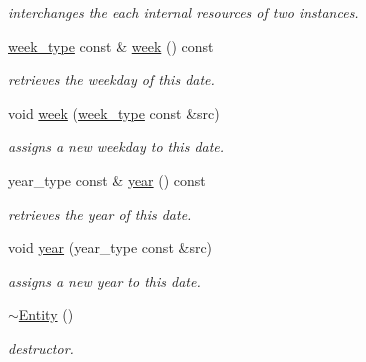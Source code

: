 \begin{DoxyCompactItemize}
\begin{DoxyCompactList}\small\item\em interchanges the each internal resources of two instances. \end{DoxyCompactList}\item 
\hypertarget{classhryky_1_1date_1_1_entity_ae2da29df451b2e3d9b145010c155bdae}{\hyperlink{classhryky_1_1_kind}{week\-\_\-type} const \& \hyperlink{classhryky_1_1date_1_1_entity_ae2da29df451b2e3d9b145010c155bdae}{week} () const }\label{classhryky_1_1date_1_1_entity_ae2da29df451b2e3d9b145010c155bdae}

\begin{DoxyCompactList}\small\item\em retrieves the weekday of this date. \end{DoxyCompactList}\item 
\hypertarget{classhryky_1_1date_1_1_entity_aa22fc221a6488db677244c4056ee1f36}{void \hyperlink{classhryky_1_1date_1_1_entity_aa22fc221a6488db677244c4056ee1f36}{week} (\hyperlink{classhryky_1_1_kind}{week\-\_\-type} const \&src)}\label{classhryky_1_1date_1_1_entity_aa22fc221a6488db677244c4056ee1f36}

\begin{DoxyCompactList}\small\item\em assigns a new weekday to this date. \end{DoxyCompactList}\item 
\hypertarget{classhryky_1_1date_1_1_entity_a75d3313038a9ddf708e60a87f107b232}{year\-\_\-type const \& \hyperlink{classhryky_1_1date_1_1_entity_a75d3313038a9ddf708e60a87f107b232}{year} () const }\label{classhryky_1_1date_1_1_entity_a75d3313038a9ddf708e60a87f107b232}

\begin{DoxyCompactList}\small\item\em retrieves the year of this date. \end{DoxyCompactList}\item 
\hypertarget{classhryky_1_1date_1_1_entity_abfd536808771bbad5965f3624fc01ceb}{void \hyperlink{classhryky_1_1date_1_1_entity_abfd536808771bbad5965f3624fc01ceb}{year} (year\-\_\-type const \&src)}\label{classhryky_1_1date_1_1_entity_abfd536808771bbad5965f3624fc01ceb}

\begin{DoxyCompactList}\small\item\em assigns a new year to this date. \end{DoxyCompactList}\item 
\hypertarget{classhryky_1_1date_1_1_entity_af5eba37229b1713d6368c03cc8c19e92}{\hyperlink{classhryky_1_1date_1_1_entity_af5eba37229b1713d6368c03cc8c19e92}{$\sim$\-Entity} ()}\label{classhryky_1_1date_1_1_entity_af5eba37229b1713d6368c03cc8c19e92}

\begin{DoxyCompactList}\small\item\em destructor. \end{DoxyCompactList}\end{DoxyCompactItemize}
